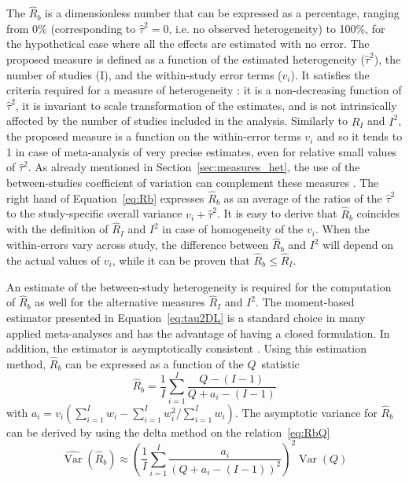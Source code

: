\documentclass[11pt,a4paper,twoside,openany]{book}\usepackage{knitr}
\DeclareMathOperator{\Var}{Var}
\begin{document}
{\noindent The $\hat R_b$ is a dimensionless number that can be expressed as a percentage, ranging from 0\% (corresponding to $\hat \tau^2 = 0$, i.e. no observed heterogeneity) to 100\%, for the hypothetical case where all the effects are estimated with no error. The proposed measure is defined as a function of the estimated heterogeneity ($\hat \tau^2$), the number of studies (I), and the within-study error terms ($v_i$). It satisfies the criteria required for a measure of heterogeneity \citep{higgins2002quantifying}: it is a non-decreasing function of $\hat \tau^2$, it is invariant to scale transformation of the estimates, and is not intrinsically affected by the number of studies included in the analysis. Similarly to $\hat R_I$ and $I^2$, the proposed measure is a function on the within-error terms $v_i$ and so it tends to 1 in case of meta-analysis of very precise estimates, even for relative small values of $\hat \tau^2$. As already mentioned in Section~\ref{sec:measures_het}, the use of the between-studies coefficient of variation can complement these measures \citep{takkouche1999evaluation}.
The right hand of Equation~\ref{eq:Rb} expresses $\hat R_b$ as an average of the ratios of the $\hat \tau^2$ to the study-specific overall variance $v_i + \hat \tau^2$. It is easy to derive that $\hat R_b$ coincides with the definition of $\hat R_I$ and $I^2$ in case of homogeneity of the $v_i$. When the within-errors vary across study, the difference between $\hat R_b$ and $I^2$ will depend on the actual values of $v_i$, while it can be proven that $\hat R_b \le \hat R_I$.

An estimate of the between-study heterogeneity is required for the computation of $\hat R_b$ as well for the alternative measures $\hat R_I$ and $I^2$. The moment-based estimator presented in Equation~\ref{eq:tau2DL} is a standard choice in many applied meta-analyses and has the advantage of having a closed formulation. In addition, the estimator is asymptotically consistent \citep{jackson2010extending}. Using this estimation method, $\hat R_b$ can be expressed as a function of the $Q$~statistic
\begin{equation}
\hat R_b = \frac{1}{I} \sum_{i = 1}^I \frac{Q - (I-1)}{Q + a_i - (I - 1)} 
\label{eq:RbQ}
\end{equation}
\noindent with $a_i = v_i \left(\sum_{i = 1}^I w_i - \sum_{i = 1}^Iw_i^2/\sum_{i = 1}^I w_i \right)$. The asymptotic variance for $\hat R_b$ can be derived by using the delta method on the relation~\ref{eq:RbQ}
\begin{equation}
\widehat{\Var} \left(\hat R_b \right) \approx \left(  \frac{1}{I} \sum_{i = 1}^I \frac{a_i}{(Q + a_i - (I-1))^2} \right)^2 \Var(Q)
\label{eq:var_Rb}
\end{equation}

}
\end{document}
